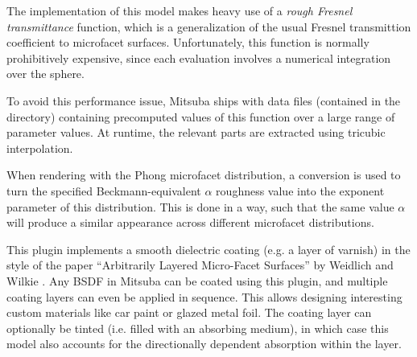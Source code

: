 The implementation of this model makes heavy use of a \emph{rough
Fresnel transmittance} function, which is a generalization of the
usual Fresnel transmittion coefficient to microfacet surfaces. Unfortunately,
this function is normally prohibitively expensive, since each
evaluation involves a numerical integration over the sphere.

To avoid this performance issue, Mitsuba ships with data files
(contained in the  directory) containing precomputed
values of this function over a large range of parameter values. At runtime,
the relevant parts are extracted using tricubic interpolation.

When rendering with the Phong microfacet distribution, a conversion is
used to turn the specified Beckmann-equivalent $\alpha$ roughness value
into the exponent parameter of this distribution. This is done in a way,
such that the same value $\alpha$ will produce a similar appearance across
different microfacet distributions.



This plugin implements a smooth dielectric coating (e.g. a layer of varnish)
in the style of the paper ``Arbitrarily Layered Micro-Facet Surfaces'' by
Weidlich and Wilkie \cite{Weidlich2007Arbitrarily}. Any BSDF in Mitsuba
can be coated using this plugin, and multiple coating layers can even
be applied in sequence. This allows designing interesting custom materials
like car paint or glazed metal foil. The coating layer can optionally be
tinted (i.e. filled with an absorbing medium), in which case this model also
accounts for the directionally dependent absorption within the layer.

